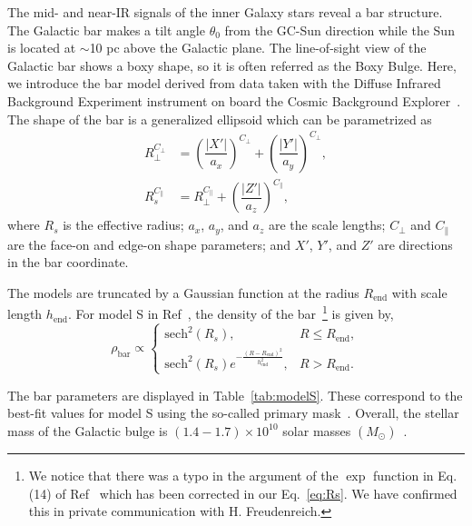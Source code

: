 \documentclass[doublespace,nopageskip]{VTthesis} %
\begin{document}
The mid- and near-IR signals of the inner Galaxy stars reveal a bar structure. The Galactic bar makes a tilt angle $\theta_0$ from the GC-Sun direction while the Sun is located at $\sim$10 pc above the Galactic plane. The line-of-sight view of the Galactic bar shows a boxy shape, so it is often referred as the Boxy Bulge. Here, we introduce the bar model derived from data taken with the Diffuse Infrared Background Experiment instrument on board the Cosmic Background Explorer~\cite{1998ApJ...492..495F}. The shape of the bar is a generalized ellipsoid which can be parametrized as
\begin{align}\label{eq:Rs}
  R_{\perp}^{C_{\perp}} &= \left(\dfrac{|X'|}{a_x}\right)^{C_{\perp}} + \left(\dfrac{|Y'|}{a_y}\right)^{C_{\perp}},\\
  R_s^{C_{\parallel}} &= R_{\perp}^{C_{\parallel}} + \left(\dfrac{|Z'|}{a_z}\right)^{C_{\parallel}},
\end{align}
where $R_s$ is the effective radius; $a_x$, $a_y$, and $a_z$ are the scale lengths; $C_\perp$ and $C_\parallel$ are the face-on and edge-on shape parameters; and $X'$, $Y'$, and $Z'$
are directions in the bar
coordinate. 

The models are truncated by a Gaussian function at the
radius $R_{\text{end}}$ with scale length $h_{\text{end}}$. For model S in Ref~\cite{1998ApJ...492..495F}, the density of the bar~\footnote{We notice that there was a typo in the argument of the $\exp$ function in Eq.(14) of Ref~\cite{1998ApJ...492..495F} which has been corrected in our Eq.~\ref{eq:Rs}. We have confirmed this in private communication with H. Freudenreich.} is given by,
\begin{equation}\label{eq:rhobar}
  \rho_{\text{bar}}\propto \begin{cases}
    \text{sech}^2(R_s), & R \leq R_{\text{end}},\\
    \text{sech}^2(R_s)e^{-\frac{(R-R_{\text{end}})^2}{h_{\text{end}}^2}}, &   R > R_{\text{end}}.
  \end{cases}
\end{equation}

The bar parameters 
are displayed in Table~\ref{tab:modelS}. These correspond to the best-fit values for model S using the so-called primary mask~\cite{1998ApJ...492..495F}. Overall, the stellar mass of the Galactic bulge is $(1.4-1.7)\times 10^{10}$ solar masses $(M_\odot)$~\cite{2016ARA&A..54..529B}.
\end{document}
